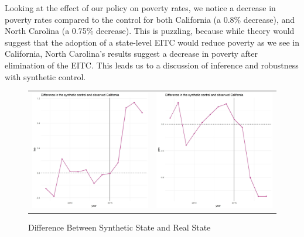 \documentclass{article}
\begin{document}
Looking at the effect of our policy on poverty rates, we notice a decrease in poverty rates compared to the control for both California (a 0.8\% decrease), and North Carolina (a 0.75\% decrease). This is puzzling, because while theory would suggest that the adoption of a state-level EITC would reduce poverty as we see in California, North Carolina's results suggest a decrease in poverty after elimination of the EITC. This leads us to a discussion of inference and robustness with synthetic control.  

\restoregeometry


\begin{figure}
\begin{center}
\caption{Difference Between Synthetic State and Real State}
\label{fig:diff}{}
\begin{tabular}{cc}
 \includegraphics[width=80mm]{ca_lab_diff} &   \includegraphics[width=80mm]{ca_pov_diff} \\

\end{tabular}
\end{center}
\end{figure}
\end{document}
